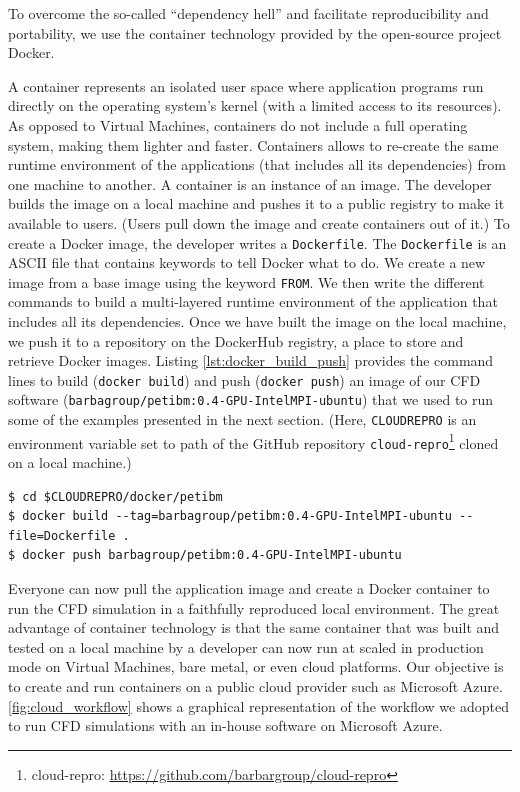 \documentclass[10pt,journal,compsoc]{IEEEtran}
\begin{document}
To overcome the so-called ``dependency hell'' and facilitate reproducibility and portability, we use the container technology provided by the open-source project Docker.

A container represents an isolated user space where application programs run directly on the operating system's kernel (with a limited access to its resources).
As opposed to Virtual Machines, containers do not include a full operating system, making them lighter and faster.
Containers allows to re-create the same runtime environment of the applications (that includes all its dependencies) from one machine to another.
A container is an instance of an image.
The developer builds the image on a local machine and pushes it to a public registry to make it available to users.
(Users pull down the image and create containers out of it.)
To create a Docker image, the developer writes a \texttt{Dockerfile}.
The \texttt{Dockerfile} is an ASCII file that contains keywords to tell Docker what to do.
We create a new image from a base image using the keyword \texttt{FROM}.
We then write the different commands to build a multi-layered runtime environment of the application that includes all its dependencies.
Once we have built the image on the local machine, we push it to a repository on the DockerHub registry, a place to store and retrieve Docker images.
Listing \ref{lst:docker_build_push} provides the command lines to build (\texttt{docker build}) and push (\texttt{docker push}) an image of our CFD software (\texttt{barbagroup/petibm:0.4-GPU-IntelMPI-ubuntu}) that we used to run some of the examples presented in the next section.
(Here, \texttt{CLOUDREPRO} is an environment variable set to path of the GitHub repository \texttt{cloud-repro}\footnote{cloud-repro: \url{https://github.com/barbargroup/cloud-repro}} cloned on a local machine.)

\begin{lstlisting}[label=lst:docker_build_push,caption={Build and push a Docker image.}]
$ cd $CLOUDREPRO/docker/petibm
$ docker build --tag=barbagroup/petibm:0.4-GPU-IntelMPI-ubuntu --file=Dockerfile .
$ docker push barbagroup/petibm:0.4-GPU-IntelMPI-ubuntu
\end{lstlisting}

Everyone can now pull the application image and create a Docker container to run the CFD simulation in a faithfully reproduced local environment.
The great advantage of container technology is that the same container that was built and tested on a local machine by a developer can now run at scaled in production mode on Virtual Machines, bare metal, or even cloud platforms.
Our objective is to create and run containers on a public cloud provider such as Microsoft Azure.
\ref{fig:cloud_workflow} shows a graphical representation of the workflow we adopted to run CFD simulations with an in-house software on Microsoft Azure.
\end{document}
